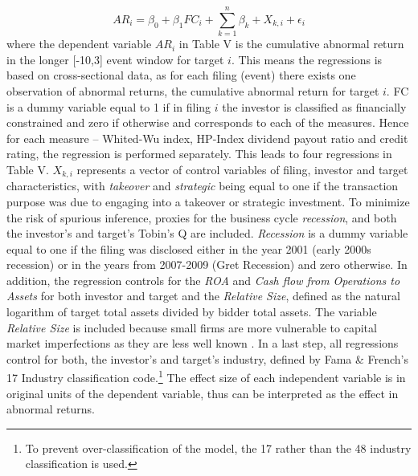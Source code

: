 \documentclass[12pt]{article}
\begin{document}
\begin{equation}
	AR_{i}=\beta_{0}+\beta_{1}FC_{i}+\sum_{k=1}^{n}\beta_{k}+X_{k,i}+\epsilon_{i}
\end{equation}
where the dependent variable $AR_{i}$ in Table V is the cumulative abnormal return in the longer [-10,3] event window for target $i$. This means the regressions is based on cross-sectional data, as for each filing (event) there exists one observation of abnormal returns, the cumulative abnormal return for target $i$. FC is a dummy variable equal to 1 if in filing $i$ the investor is classified as financially constrained and zero if otherwise and corresponds to each of the measures. Hence for each measure -- Whited-Wu index, HP-Index dividend payout ratio and credit rating, the regression is performed separately. This leads to four regressions in Table V. $X_{k,i}$ represents a vector of control variables of filing, investor and target characteristics, with \emph{takeover} and \emph{strategic} being equal to one if the transaction purpose was due to engaging into a takeover or strategic investment. To minimize the risk of spurious inference, proxies for the business cycle \emph{recession}, and both the investor's and target's Tobin's Q are included. \emph{Recession} is a dummy variable equal to one if the filing was disclosed either in the year 2001 (early 2000s recession) or in the years from 2007-2009 (Gret Recession) and zero otherwise. In addition, the regression controls for the \emph{ROA} and \emph{Cash flow from Operations to Assets} for both investor and target and the \emph{Relative Size}, defined as the natural logarithm of target total assets divided by bidder total assets. The variable \emph{Relative Size} is included because small firms are more vulnerable to capital market imperfections  as they are less well known \citep[p.2004]{Almeida2004}. In a last step, all regressions control for both, the investor's and target's industry, defined by Fama \& French's 17 Industry classification code.\footnote{To prevent over-classification of the model, the 17 rather than the 48 industry classification is used.} The effect size of each independent variable is in original units of the dependent variable, thus can be interpreted as the effect in abnormal returns. 
\end{document}
